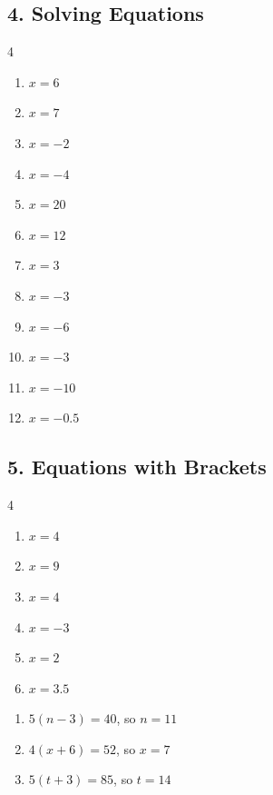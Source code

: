 \documentclass[12pt,a4paper]{article}
\begin{document}
\subsection*{4. Solving Equations}
\begin{multicols}{4}\begin{enumerate}[nosep, label=\arabic*., start=1]
\item $x = 6$
\item $x = 7$
\item $x = -2$
\item $x = -4$
\item $x = 20$
\item $x = 12$
\item $x = 3$
\item $x = -3$
\item $x = -6$
\item $x = -3$
\item $x = -10$
\item $x = -0.5$
\end{enumerate}\end{multicols}

\subsection*{5. Equations with Brackets}
\begin{multicols}{4}\begin{enumerate}[nosep, label=\arabic*., start=1]
\item $x = 4$
\item $x = 9$
\item $x = 4$
\item $x = -3$
\item $x = 2$
\item $x = 3.5$
\end{enumerate}\end{multicols}
\begin{enumerate}[nosep, label=\arabic*., start=7]
\item $5(n - 3) = 40$, so $n = 11$
\item $4(x + 6) = 52$, so $x = 7$
\item $5(t + 3) = 85$, so $t = 14$
\end{enumerate}
\end{document}
